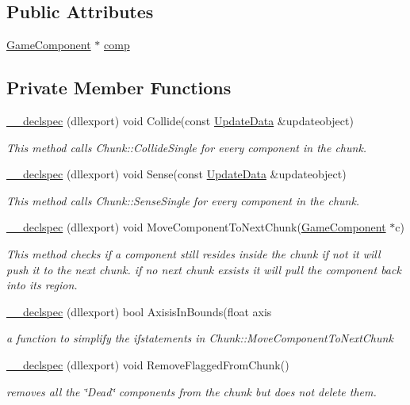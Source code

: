 \subsection*{Public Attributes}
\begin{DoxyCompactItemize}
\item 
\hyperlink{class_game_component}{Game\-Component} $\ast$ \hyperlink{class_chunk_a633545d862acb016a7081c364126c7b8}{comp}
\end{DoxyCompactItemize}
\subsection*{Private Member Functions}
\begin{DoxyCompactItemize}
\item 
\hyperlink{class_chunk_a09fed540af40e1ad76e8ef2babbfe616}{\-\_\-\-\_\-declspec} (dllexport) void Collide(const \hyperlink{class_update_data}{Update\-Data} \&updateobject)
\begin{DoxyCompactList}\small\item\em This method calls Chunk\-::\-Collide\-Single for every component in the chunk. \end{DoxyCompactList}\item 
\hyperlink{class_chunk_a8a24db04cbc32e330b07d34caa61eeb1}{\-\_\-\-\_\-declspec} (dllexport) void Sense(const \hyperlink{class_update_data}{Update\-Data} \&updateobject)
\begin{DoxyCompactList}\small\item\em This method calls Chunk\-::\-Sense\-Single for every component in the chunk. \end{DoxyCompactList}\item 
\hyperlink{class_chunk_a5c65ce716caab3e2c5bd9193f8e29888}{\-\_\-\-\_\-declspec} (dllexport) void Move\-Component\-To\-Next\-Chunk(\hyperlink{class_game_component}{Game\-Component} $\ast$c)
\begin{DoxyCompactList}\small\item\em This method checks if a component still resides inside the chunk if not it will push it to the next chunk. if no next chunk exsists it will pull the component back into its region. \end{DoxyCompactList}\item 
\hyperlink{class_chunk_aad4ce00be30a71cddc9a17226a992a0f}{\-\_\-\-\_\-declspec} (dllexport) bool Axisis\-In\-Bounds(float axis
\begin{DoxyCompactList}\small\item\em a function to simplify the ifstatements in Chunk\-::\-Move\-Component\-To\-Next\-Chunk \end{DoxyCompactList}\item 
\hyperlink{class_chunk_aecb19003f0e0330920cf7695fbdc5700}{\-\_\-\-\_\-declspec} (dllexport) void Remove\-Flagged\-From\-Chunk()
\begin{DoxyCompactList}\small\item\em removes all the \char`\"{}\-Dead\char`\"{} components from the chunk but does not delete them. \end{DoxyCompactList}\end{DoxyCompactItemize}
